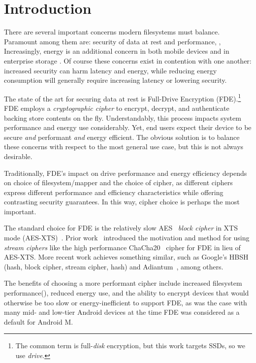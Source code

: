 \section{Introduction}\label{sec:introduction}

There are several important concerns modern filesystems must balance. Paramount
among them are: security of data at rest and performance, ,  Increasingly, energy is an additional concern in both mobile devices \cite{mobile-motivation} and in enterprise storage \cite{enterprise-motivation}.  Of course these concerns exist in contention with one another: increased security can harm latency and energy, while reducing energy consumption will generally require increasing latency or lowering security.   

The state of the art for securing data at rest is Full-Drive Encryption
(FDE).\footnote{The common term is full-\emph{disk} encryption, but this work
targets SSDs, so we use \emph{drive}.} FDE employs a \emph{cryptographic
cipher} to encrypt, decrypt, and authenticate backing store contents on the fly.
Understandably, this process impacts system performance and energy use
considerably. Yet, end users expect their device to be secure \emph{and}
performant \emph{and} energy efficient. The obvious solution is to balance these
concerns with respect to the most general use case, but this is not always
desirable. 

Traditionally, FDE's impact on drive performance and energy efficiency depends
on choice of filesystem/mapper and the choice of cipher, as different ciphers
express different performance and efficiency characteristics while offering
contrasting security guarantees. In this way, cipher choice is perhaps the most
important.

The standard choice for FDE is the relatively slow AES~\cite{AES} \emph{block
cipher} in XTS mode (AES-XTS)~\cite{AES-XTS}. Prior work~\cite{StrongBox}
introduced the motivation and method for using \emph{stream ciphers} like the
high performance ChaCha20~\cite{ChaCha20} cipher for FDE in lieu of AES-XTS.
More recent work achieves something similar, such as Google's HBSH~\cite{HBSH}
(hash, block cipher, stream cipher, hash) and Adiantum~\cite{Adiantum}, among
others.

The benefits of choosing a more performant cipher include increased filesystem
performance(), reduced energy use, and the
ability to encrypt devices that would otherwise be too slow or
energy-inefficient to support FDE, as was the case with many mid- and low-tier
Android devices at the time FDE was considered as a default for Android M. 

